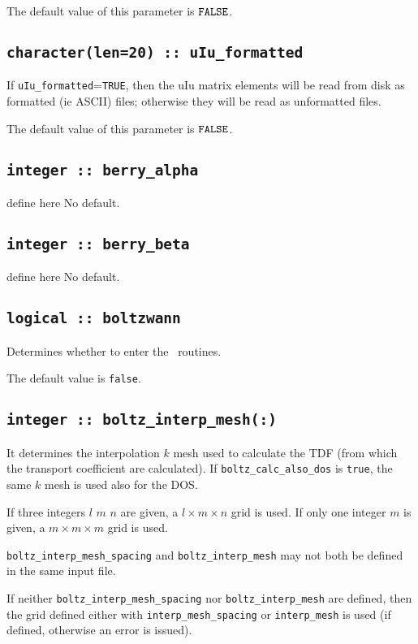 The default value of this parameter is $\verb#FALSE#$.

\subsection[uIu\_formated]{\tt character(len=20) :: uIu\_formatted}

If \verb#uIu_formatted#=\verb#TRUE#, then the uIu matrix elements will be
read from disk as formatted (ie ASCII) files; otherwise they will be
read as unformatted files.

The default value of this parameter is $\verb#FALSE#$.

\subsection[berry\_alpha]{\tt integer :: berry\_alpha}
define here
No default.

\subsection[berry\_alpha]{\tt integer :: berry\_beta}
define here
No default.




\clearpage
\subsection[boltzwann]{\tt logical :: boltzwann}
Determines whether to enter the \bw\ routines.

The default value is \verb#false#.

\subsection[boltz\_interp\_mesh]{\tt integer :: boltz\_interp\_mesh(:)}
It determines the interpolation $k$ mesh used to calculate the TDF (from which the transport coefficient are calculated). If {\tt boltz\_calc\_also\_dos} is \verb#true#, the same $k$ mesh is used also for the DOS.

If three integers $l$ $m$ $n$ are given, a $l\times m\times n$ grid is used. If only one integer $m$ is given, a $m\times m\times m$ grid is used.

{\tt boltz\_interp\_mesh\_spacing} and  {\tt boltz\_interp\_mesh} may not both be defined in the same input file.

If neither {\tt boltz\_interp\_mesh\_spacing} nor  {\tt boltz\_interp\_mesh} are defined, then the grid defined either with {\tt interp\_mesh\_spacing} or {\tt interp\_mesh} is used (if defined, otherwise an error is issued).

